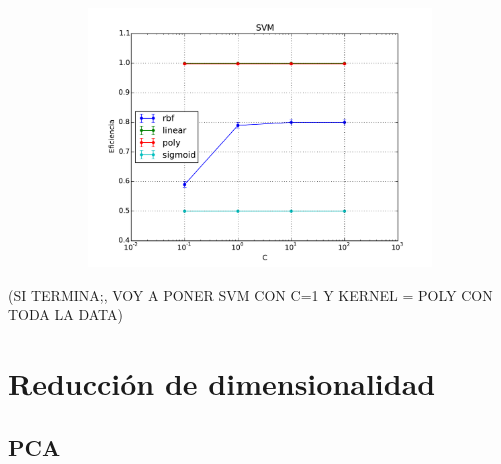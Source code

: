 \documentclass[a4paper,10pt]{article}
\begin{document}
\begin{figure}[H]
  \centering
  \begin{subfigure}[b]{0.4\textwidth}
    \includegraphics[width=\textwidth]{../imagenes/SVM}
     \caption{}
  \end{subfigure}
  \label{fig:svm}
\end{figure}

(SI TERMINA;, VOY A PONER SVM CON C=1 Y KERNEL = POLY CON TODA LA DATA)

\section{Reducci\'on de dimensionalidad}

\subsection{PCA}
\end{document}

